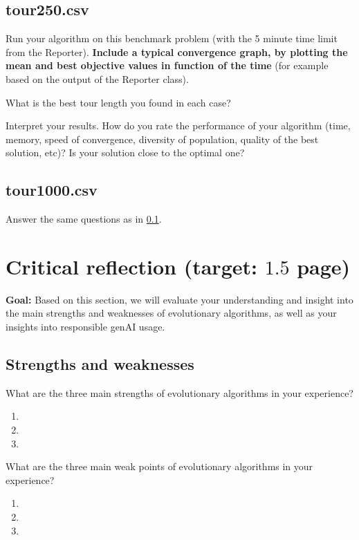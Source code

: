 \documentclass[a4paper,10pt]{article}
\newcommand{\ReplaceMe}[1]{{\color{blue}#1}}
\newcommand{\RemoveMe}[1]{{\color{purple}#1}}
\begin{document}
\subsection{tour250.csv}\label{sec_shorttour}
\ReplaceMe{Run your algorithm on this benchmark problem (with the 5 minute time limit from the Reporter). \textbf{Include a typical convergence graph, by plotting the mean and best objective values in function of the time} (for example based on the output of the Reporter class).

What is the best tour length you found in each case? 

Interpret your results. How do you rate the performance of your algorithm (time, memory, speed of convergence, diversity of population, quality of the best solution, etc)? Is your solution close to the optimal one?}


\subsection{tour1000.csv}

\ReplaceMe{Answer the same questions as in \cref{sec_shorttour}.}

\section{Critical reflection \hfill(target: $1.5$ page)}

\RemoveMe{\textbf{Goal:} Based on this section, we will evaluate your understanding and insight into the main strengths and weaknesses of evolutionary algorithms, as well as your insights into responsible genAI usage.}

\subsection{Strengths and weaknesses}
\ReplaceMe{What are the three main strengths of evolutionary algorithms in your experience?}

\begin{enumerate}
 \item 
 \item 
 \item 
\end{enumerate}

\ReplaceMe{What are the three main weak points of evolutionary algorithms in your experience?}

\begin{enumerate}
 \item 
 \item 
 \item 
\end{enumerate}
\end{document}
